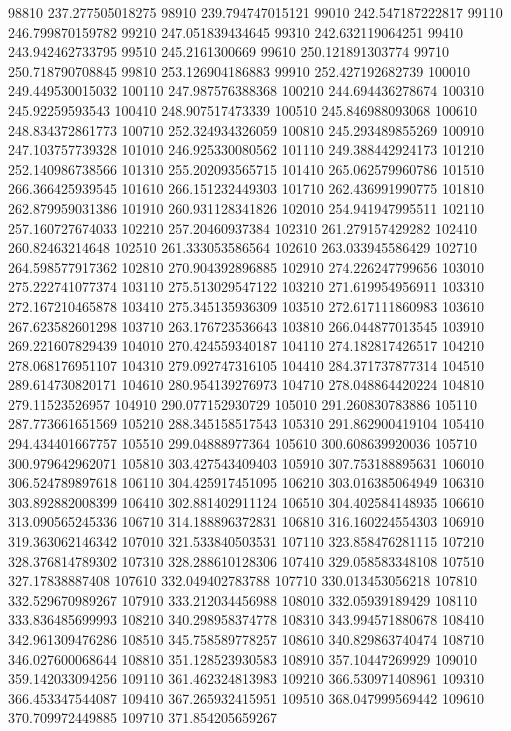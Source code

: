 {98810 237.277505018275
98910 239.794747015121
99010 242.547187222817
99110 246.799870159782
99210 247.051839434645
99310 242.632119064251
99410 243.942462733795
99510 245.2161300669
99610 250.121891303774
99710 250.718790708845
99810 253.126904186883
99910 252.427192682739
100010 249.449530015032
100110 247.987576388368
100210 244.694436278674
100310 245.92259593543
100410 248.907517473339
100510 245.846988093068
100610 248.834372861773
100710 252.324934326059
100810 245.293489855269
100910 247.103757739328
101010 246.925330080562
101110 249.388442924173
101210 252.140986738566
101310 255.202093565715
101410 265.062579960786
101510 266.366425939545
101610 266.151232449303
101710 262.436991990775
101810 262.879959031386
101910 260.931128341826
102010 254.941947995511
102110 257.160727674033
102210 257.20460937384
102310 261.279157429282
102410 260.82463214648
102510 261.333053586564
102610 263.033945586429
102710 264.598577917362
102810 270.904392896885
102910 274.226247799656
103010 275.222741077374
103110 275.513029547122
103210 271.619954956911
103310 272.167210465878
103410 275.345135936309
103510 272.617111860983
103610 267.623582601298
103710 263.176723536643
103810 266.044877013545
103910 269.221607829439
104010 270.424559340187
104110 274.182817426517
104210 278.068176951107
104310 279.092747316105
104410 284.371737877314
104510 289.614730820171
104610 280.954139276973
104710 278.048864420224
104810 279.11523526957
104910 290.077152930729
105010 291.260830783886
105110 287.773661651569
105210 288.345158517543
105310 291.862900419104
105410 294.434401667757
105510 299.04888977364
105610 300.608639920036
105710 300.979642962071
105810 303.427543409403
105910 307.753188895631
106010 306.524789897618
106110 304.425917451095
106210 303.016385064949
106310 303.892882008399
106410 302.881402911124
106510 304.402584148935
106610 313.090565245336
106710 314.188896372831
106810 316.160224554303
106910 319.363062146342
107010 321.533840503531
107110 323.858476281115
107210 328.376814789302
107310 328.288610128306
107410 329.058583348108
107510 327.17838887408
107610 332.049402783788
107710 330.013453056218
107810 332.529670989267
107910 333.212034456988
108010 332.05939189429
108110 333.836485699993
108210 340.298958374778
108310 343.994571880678
108410 342.961309476286
108510 345.758589778257
108610 340.829863740474
108710 346.027600068644
108810 351.128523930583
108910 357.10447269929
109010 359.142033094256
109110 361.462324813983
109210 366.530971408961
109310 366.453347544087
109410 367.265932415951
109510 368.047999569442
109610 370.709972449885
109710 371.854205659267
}
